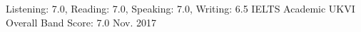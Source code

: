 
\begin{cventries}
  \cventryc
    {Listening: 7.0, Reading: 7.0, Speaking: 7.0, Writing: 6.5}
    {IELTS Academic UKVI}
    {Overall Band Score: 7.0}
    {Nov. 2017}
  
\end{cventries}

